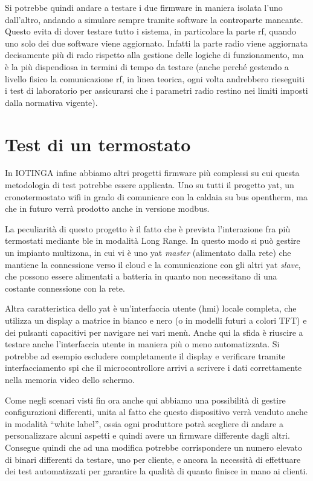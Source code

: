 \documentclass[12pt,a4paper,twoside,titlepage]{book}
\begin{document}
Si potrebbe quindi andare a testare i due \gls{firmware} in maniera isolata l'uno dall'altro,
andando a simulare sempre tramite software la controparte mancante. Questo evita di dover
testare tutto i sistema, in particolare la parte \acrshort{rf}, quando uno solo dei due software viene
aggiornato. Infatti la parte radio viene aggiornata decisamente più di rado rispetto alla
gestione delle logiche di funzionamento, ma è la più dispendiosa in termini di tempo da testare
(anche perché gestendo a livello fisico la comunicazione \acrshort{rf}, in linea teorica, ogni volta 
andrebbero rieseguiti i test di laboratorio per assicurarsi che i parametri radio restino nei limiti
imposti dalla normativa vigente).

\section{Test di un termostato}

In IOTINGA infine abbiamo altri progetti \gls{firmware} più complessi su cui questa metodologia
di test potrebbe essere applicata. Uno su tutti il progetto \acrfull{yat},
un cronotermostato \Gls{wifi} in grado di comunicare con la caldaia su bus \Gls{opentherm}, ma
che in futuro verrà prodotto anche in versione \Gls{modbus}.

La peculiarità di questo progetto è il fatto che è prevista l'interazione fra più
termostati mediante \acrshort{ble} in modalità Long Range. In questo modo
si può gestire un impianto multizona, in cui vi è uno \acrshort{yat} \textit{master} (alimentato
dalla rete) che mantiene la connessione verso il \gls{cloud} e la comunicazione
con gli altri \acrshort{yat} \textit{slave}, che possono essere alimentati a batteria
in quanto non necessitano di una costante connessione con la rete.

Altra caratteristica dello \acrshort{yat} è un'interfaccia utente (\acrshort{hmi})
locale completa, che utilizza un display a matrice in bianco e nero (o in modelli
futuri a colori TFT) e dei pulsanti capacitivi per navigare nei vari menù. Anche
qui la sfida è riuscire a testare anche l'interfaccia utente in maniera più o meno
automatizzata. Si potrebbe ad esempio escludere completamente il display e verificare
tramite interfacciamento \acrshort{spi} che il microcontrollore arrivi a scrivere i dati correttamente
nella memoria video dello schermo.

Come negli scenari visti fin ora anche qui abbiamo una possibilità di gestire configurazioni
differenti, unita al fatto che questo dispositivo verrà venduto anche in modalità ``white label'',
ossia ogni produttore potrà scegliere di andare a personalizzare alcuni aspetti e quindi
avere un \gls{firmware} differente dagli altri. Consegue quindi che ad una modifica potrebbe
corrispondere un numero elevato di binari differenti da testare, uno per cliente, e
ancora la necessità di effettuare dei test automatizzati per garantire la qualità di
quanto finisce in mano ai clienti.
\end{document}
